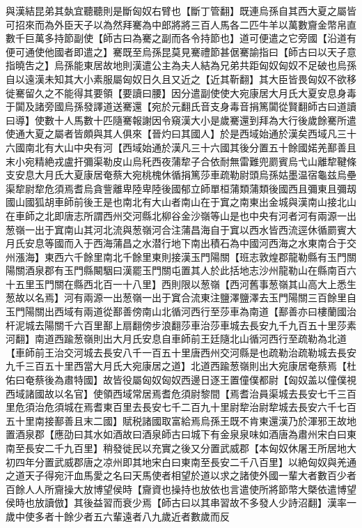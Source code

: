 與漢結昆弟其埶宜聽聽則是斷匈奴右臂也【斷丁管翻】既連烏孫自其西大夏之屬皆可招來而為外臣天子以為然拜騫為中郎將將三百人馬各二匹牛羊以萬數齎金幣帛直數千巨萬多持節副使【師古曰為騫之副而各令持節也】道可便遣之它旁國【沿道有便可通使他國者即遣之】騫既至烏孫昆莫見騫禮節甚倨騫諭指曰【師古曰以天子意指曉吿之】烏孫能東居故地則漢遣公主為夫人結為兄弟共距匈奴匈奴不足破也烏孫自以遠漢未知其大小素服屬匈奴日久且又近之【近其靳翻】其大臣皆畏匈奴不欲移徙騫留久之不能得其要領【要讀曰腰】因分遣副使使大宛康居大月氏大夏安息身毒于闐及諸旁國烏孫發譯道送騫還【宛於元翻氏音支身毒音捐篤闐從賢翻師古曰道讀曰導】使數十人馬數十匹隨騫報謝因令窺漢大小是歲騫還到拜為大行後歲餘騫所遣使通大夏之屬者皆頗與其人俱來【晉灼曰其國人】於是西域始通於漢矣西域凡三十六國南北有大山中央有河【西域始通於漢凡三十六國其後分置五十餘國婼羌鄯善且末小宛精絶戎盧扞彌渠勒皮山烏秅西夜蒲犂子合依耐無雷難兜罽賓烏弋山離犂鞬條支安息大月氏大夏康居奄蔡大宛桃槐休循捐篤莎車疏勒尉頭烏孫姑墨温宿龜兹烏壘渠犂尉犂危須焉耆烏貪訾離卑陸卑陸後國郁立師單桓蒲類蒲類後國西且彌東且彌刼國山國狐胡車師前後王是也南北有大山者南山在于窴之南東出金城與漢南山接北山在車師之北即唐志所謂西州交河縣北柳谷金沙嶺等山是也中央有河者河有兩源一出葱嶺一出于窴南山其河北流與葱嶺河合注蒲昌海自于窴以西水皆西流逕休循罽賓大月氏安息等國而入于西海蒲昌之水潜行地下南出積石為中國河西海之水東南合于交州漲海】東西六千餘里南北千餘里東則接漢玉門陽關【班志敦煌郡龍勒縣有玉門關陽關酒泉郡有玉門縣闞駰曰漢罷玉門關屯置其人於此括地志沙州龍勒山在縣南百六十五里玉門關在縣西北百一十八里】西則限以葱嶺【西河舊事葱嶺其山高大上悉生葱故以名焉】河有兩源一出葱嶺一出于窴合流東注鹽澤鹽澤去玉門陽關三百餘里自玉門陽關出西域有兩道從鄯善傍南山北循河西行至莎車為南道【鄯善亦曰樓蘭國治杆泥城去陽關千六百里鄯上扇翻傍步浪翻莎車治莎車城去長安九千九百五十里莎素河翻】南道西踰葱嶺則出大月氏安息自車師前王廷隨北山循河西行至疏勒為北道【車師前王治交河城去長安八千一百五十里唐西州交河縣是也疏勒治疏勒城去長安九千三百五十里西當大月氏大宛康居之道】北道西踰葱嶺則出大宛康居奄蔡焉【杜佑曰奄蔡後為肅特國】故皆役屬匈奴匈奴西邊日逐王置僮僕都尉【匈奴盖以僮僕視西域諸國故以名官】使領西域常居焉耆危須尉黎間【焉耆治員渠城去長安七千三百里危須治危須城在焉耆東百里去長安七千二百九十里尉犂治尉犂城去長安六千七百五十里南接鄯善且末二國】賦税諸國取富給焉烏孫王既不肯東還漢乃於渾邪王故地置酒泉郡【應劭曰其水如酒故曰酒泉師古曰城下有金泉泉味如酒唐為肅州宋白曰東南至長安二千九百里】稍發徙民以充實之後又分置武威郡【本匈奴休屠王所居地大初四年分置武威郡唐之凉州即其地宋白曰東南至長安二千八百里】以絶匈奴與羌通之道天子得宛汗血馬愛之名曰天馬使者相望於道以求之諸使外國一輩大者數百少者百餘人人所齎操大放博望侯時【齎資也操持也放依也言遣使所將節幣大槩依遣博望侯時也放讀倣】其後益習而衰少焉【師古曰以其串習故不多發人少詩沼翻】漢率一歲中使多者十餘少者五六輩遠者八九歲近者數歲而反

